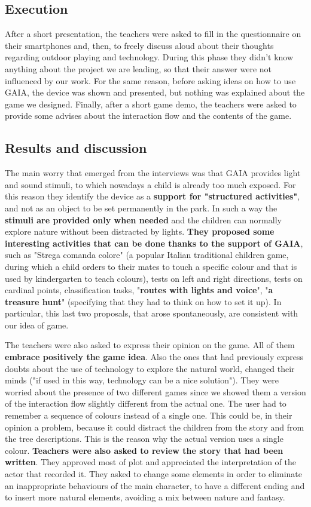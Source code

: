 \documentclass[a4paper,11pt]{report}
\begin{document}
\subsection{Execution}
After a short presentation, the teachers were asked to fill in the questionnaire on their smartphones and, then, to freely discuss aloud about their thoughts regarding outdoor playing and technology. During this phase they didn't know anything about the project we are leading, so that their answer were not influenced by our work. For the same reason, before asking ideas on how to use GAIA, the device was shown and presented, but nothing was explained about the game we designed. Finally, after a short game demo, the teachers were asked to provide some advises about the interaction flow and the contents of the game.
\subsection{Results and discussion}
The main worry that emerged from the interviews was that GAIA provides light and sound stimuli, to which nowadays a child is already too much exposed. For this reason they identify the device as a \textbf{support for "structured activities"}, and not as an object to be set permanently in the park. In such a way the \textbf{stimuli are provided only when needed} and the children can normally explore nature without been distracted by lights. \textbf{They proposed some interesting activities that can be done thanks to the support of GAIA}, such as "Strega comanda colore" (a popular Italian traditional children game, during which a child orders to their mates to touch a specific colour and that is used by kindergarten to teach colours), tests on left and right directions, tests on cardinal points, classification tasks, "\textbf{routes with lights and voice}", "\textbf{a treasure hunt}" (specifying that they had to think on how to set it up). In particular, this last two proposals, that arose spontaneously, are consistent with our idea of game. \par
The teachers were also asked to express their opinion on the game. All of them \textbf{embrace positively the game idea}. Also the ones that had previously express doubts about the use of technology to explore the natural world, changed their minds ("if used in this way, technology can be a nice solution"). They were worried about the presence of two different games since we showed them a version of the interaction flow slightly different from the actual one. The user had to remember a sequence of colours instead of a single one. This could be, in their opinion a problem, because it could distract the children from the story and from the tree descriptions. This is the reason why the actual version uses a single colour. \textbf{Teachers were also asked to review the story that had been written}. They approved most of plot and appreciated the interpretation of the actor that recorded it. They asked to change some elements in order to eliminate an inappropriate behaviours of the main character, to have a different ending and to insert more natural elements, avoiding a mix between nature and fantasy.
\end{document}
